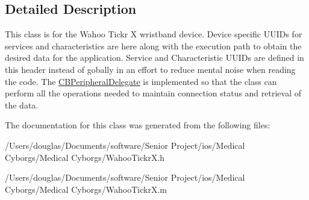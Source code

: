 \subsection{Detailed Description}
This class is for the Wahoo Tickr X wristband device. Device specific U\-U\-I\-Ds for services and characteristics are here along with the execution path to obtain the desired data for the application. Service and Characteristic U\-U\-I\-Ds are defined in this header instead of gobally in an effort to reduce mental noise when reading the code. The \hyperlink{class_c_b_peripheral_delegate-p}{C\-B\-Peripheral\-Delegate} is implemented so that the class can perform all the operations needed to maintain connection status and retrieval of the data. 

The documentation for this class was generated from the following files\-:\begin{DoxyCompactItemize}
\item 
/\-Users/douglas/\-Documents/software/\-Senior Project/ios/\-Medical Cyborgs/\-Medical Cyborgs/Wahoo\-Tickr\-X.\-h\item 
/\-Users/douglas/\-Documents/software/\-Senior Project/ios/\-Medical Cyborgs/\-Medical Cyborgs/Wahoo\-Tickr\-X.\-m\end{DoxyCompactItemize}
